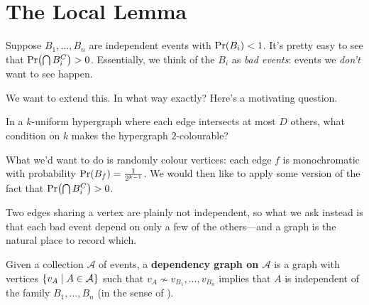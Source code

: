 \section{The \protect\Lovasz{} Local Lemma}

Suppose $B_1, \ldots, B_n$ are independent events with $\Pr\!\left( B_i \right) < 1$. It's pretty easy to see that $\Pr\!\left( \bigcap B_i^C \right) > 0$. Essentially, we think of the $B_i$ as \textit{bad events}: events we \textit{don't} want to see happen.

We want to extend this. In what way exactly? Here's a motivating question.

In a $k$-uniform hypergraph where each edge intersects at most $D$ others, what condition on $k$ makes the hypergraph $2$-colourable?

What we'd want to do is randomly colour vertices: each edge $f$ is monochromatic with probability $\Pr\!\left( B_f \right) = \frac{1}{2^{k-1}}$. We would then like to apply some version of the fact that $\Pr\!\left( \bigcap B_i^C \right) > 0$.

Two edges sharing a vertex are plainly not independent, so what we ask instead is that each bad event depend on only a few of the others---and a graph is the natural place to record which.

\begin{boxdefinition} \label{Ch5:Def:Dependency_Graph}
    Given a collection $\mathcal{A}$ of events, a \textbf{dependency graph on $\mathcal{A}$} is a graph with vertices $\left\{ v_A \; \middle\vert \; A \in \mathcal{A} \right\}$ such that $v_A \not\sim v_{B_1}, \ldots, v_{B_n}$ implies that $A$ is independent of the family $B_1, \ldots, B_n$ (in the sense of ).
\end{boxdefinition}


